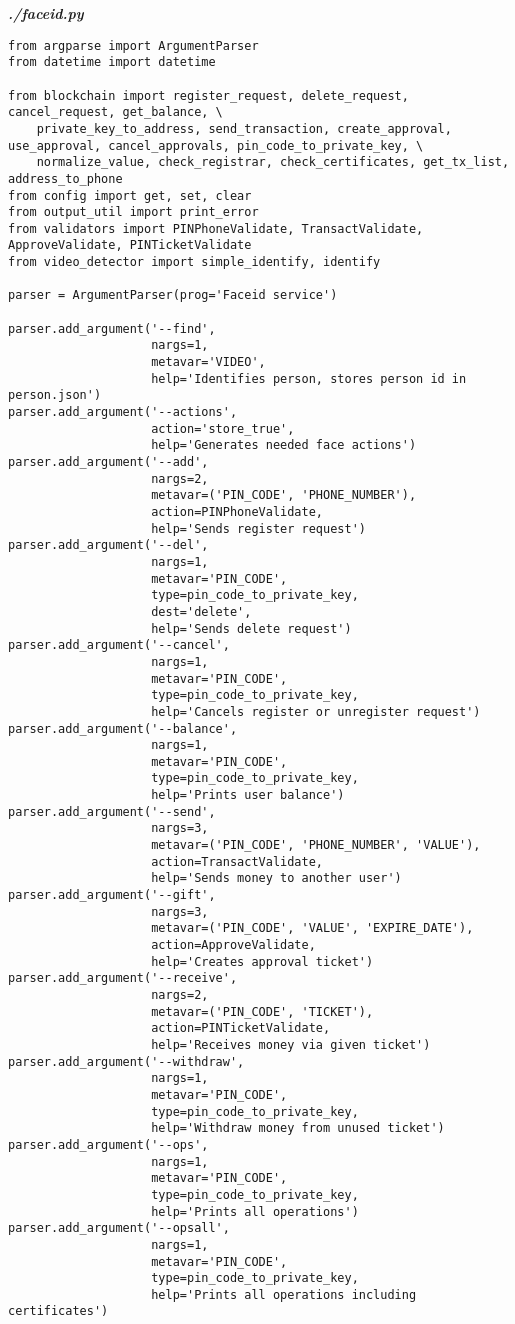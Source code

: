 \textit{\textbf{./faceid.py}}
\begin{verbatim}
from argparse import ArgumentParser
from datetime import datetime

from blockchain import register_request, delete_request, cancel_request, get_balance, \
    private_key_to_address, send_transaction, create_approval, use_approval, cancel_approvals, pin_code_to_private_key, \
    normalize_value, check_registrar, check_certificates, get_tx_list, address_to_phone
from config import get, set, clear
from output_util import print_error
from validators import PINPhoneValidate, TransactValidate, ApproveValidate, PINTicketValidate
from video_detector import simple_identify, identify

parser = ArgumentParser(prog='Faceid service')

parser.add_argument('--find',
                    nargs=1,
                    metavar='VIDEO',
                    help='Identifies person, stores person id in person.json')
parser.add_argument('--actions',
                    action='store_true',
                    help='Generates needed face actions')
parser.add_argument('--add',
                    nargs=2,
                    metavar=('PIN_CODE', 'PHONE_NUMBER'),
                    action=PINPhoneValidate,
                    help='Sends register request')
parser.add_argument('--del',
                    nargs=1,
                    metavar='PIN_CODE',
                    type=pin_code_to_private_key,
                    dest='delete',
                    help='Sends delete request')
parser.add_argument('--cancel',
                    nargs=1,
                    metavar='PIN_CODE',
                    type=pin_code_to_private_key,
                    help='Cancels register or unregister request')
parser.add_argument('--balance',
                    nargs=1,
                    metavar='PIN_CODE',
                    type=pin_code_to_private_key,
                    help='Prints user balance')
parser.add_argument('--send',
                    nargs=3,
                    metavar=('PIN_CODE', 'PHONE_NUMBER', 'VALUE'),
                    action=TransactValidate,
                    help='Sends money to another user')
parser.add_argument('--gift',
                    nargs=3,
                    metavar=('PIN_CODE', 'VALUE', 'EXPIRE_DATE'),
                    action=ApproveValidate,
                    help='Creates approval ticket')
parser.add_argument('--receive',
                    nargs=2,
                    metavar=('PIN_CODE', 'TICKET'),
                    action=PINTicketValidate,
                    help='Receives money via given ticket')
parser.add_argument('--withdraw',
                    nargs=1,
                    metavar='PIN_CODE',
                    type=pin_code_to_private_key,
                    help='Withdraw money from unused ticket')
parser.add_argument('--ops',
                    nargs=1,
                    metavar='PIN_CODE',
                    type=pin_code_to_private_key,
                    help='Prints all operations')
parser.add_argument('--opsall',
                    nargs=1,
                    metavar='PIN_CODE',
                    type=pin_code_to_private_key,
                    help='Prints all operations including certificates')


\end{verbatim}

